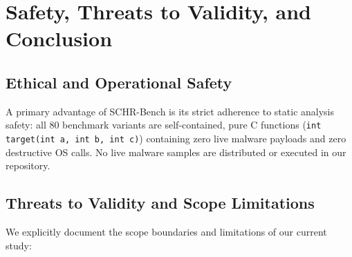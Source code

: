 \documentclass[conference]{IEEEtran}
\begin{document}
\section{Safety, Threats to Validity, and Conclusion}

\subsection{Ethical and Operational Safety}
A primary advantage of SCHR-Bench is its strict adherence to static analysis safety: all 80 benchmark variants are self-contained, pure C functions (\texttt{int target(int a, int b, int c)}) containing zero live malware payloads and zero destructive OS calls. No live malware samples are distributed or executed in our repository.

\subsection{Threats to Validity and Scope Limitations}
\label{sec:threats}
We explicitly document the scope boundaries and limitations of our current study:
\end{document}

